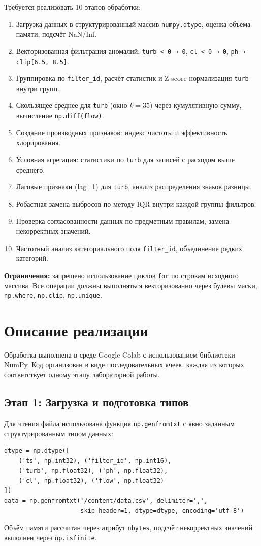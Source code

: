 \documentclass[oneside,a4paper,14pt]{extarticle}
\begin{document}
\noindent
Требуется реализовать 10 этапов обработки:
\begin{enumerate}
	\item Загрузка данных в структурированный массив \texttt{numpy.dtype}, оценка объёма памяти, подсчёт NaN/Inf.
	\item Векторизованная фильтрация аномалий: \texttt{turb < 0 → 0}, \texttt{cl < 0 → 0}, \texttt{ph → clip[6.5, 8.5]}.
	\item Группировка по \texttt{filter\_id}, расчёт статистик и Z-score нормализация \texttt{turb} внутри групп.
	\item Скользящее среднее для \texttt{turb} (окно $k=35$) через кумулятивную сумму, вычисление \texttt{np.diff(flow)}.
	\item Создание производных признаков: индекс чистоты и эффективность хлорирования.
	\item Условная агрегация: статистики по \texttt{turb} для записей с расходом выше среднего.
	\item Лаговые признаки (lag=1) для \texttt{turb}, анализ распределения знаков разницы.
	\item Робастная замена выбросов по методу IQR внутри каждой группы фильтров.
	\item Проверка согласованности данных по предметным правилам, замена некорректных значений.
	\item Частотный анализ категориального поля \texttt{filter\_id}, объединение редких категорий.
\end{enumerate}

\indent
\textbf{Ограничения:} запрещено использование циклов \texttt{for} по строкам исходного массива. Все операции должны выполняться векторизованно через булевы маски, \texttt{np.where}, \texttt{np.clip}, \texttt{np.unique}.

\section*{Описание реализации}
\indent
Обработка выполнена в среде Google Colab с использованием библиотеки NumPy. Код организован в виде последовательных ячеек, каждая из которых соответствует одному этапу лабораторной работы.

\newpage
\subsection*{Этап 1: Загрузка и подготовка типов}
Для чтения файла использована функция \texttt{np.genfromtxt} с явно заданным структурированным типом данных:
\begin{lstlisting}
dtype = np.dtype([
	('ts', np.int32), ('filter_id', np.int16),
	('turb', np.float32), ('ph', np.float32),
	('cl', np.float32), ('flow', np.float32)
])
data = np.genfromtxt('/content/data.csv', delimiter=',', 
					 skip_header=1, dtype=dtype, encoding='utf-8')
\end{lstlisting}
Объём памяти рассчитан через атрибут \texttt{nbytes}, подсчёт некорректных значений выполнен через \texttt{np.isfinite}.
\end{document}

